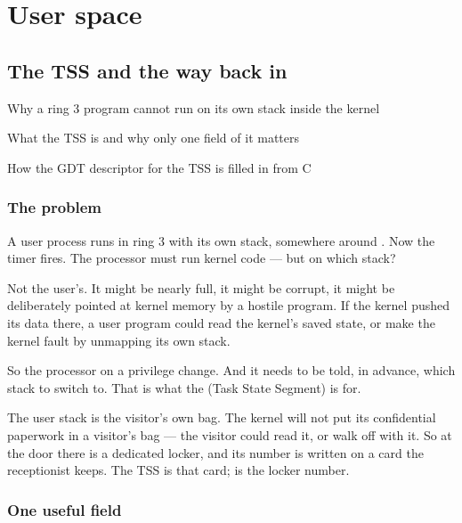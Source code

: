 \part{User space}

\chapter{The TSS and the way back in}

\begin{goals}
  \item Why a ring 3 program cannot run on its own stack inside the kernel
  \item What the TSS is and why only one field of it matters
  \item How the GDT descriptor for the TSS is filled in from C
\end{goals}

\section{The problem}

A user process runs in ring 3 with its own stack, somewhere around . Now the timer
fires. The processor must run kernel code --- but on which stack?

Not the user's. It might be nearly full, it might be corrupt, it might be deliberately pointed at
kernel memory by a hostile program. If the kernel pushed its data there, a user program could read
the kernel's saved state, or make the kernel fault by unmapping its own stack.

So the processor  on a privilege change. And it needs to be
told, in advance, which stack to switch to. That is what the  (Task State Segment) is for.

\begin{analogy}
The user stack is the visitor's own bag. The kernel will not put its confidential paperwork in a
visitor's bag --- the visitor could read it, or walk off with it. So at the door there is a
dedicated locker, and its number is written on a card the receptionist keeps. The TSS is that card;
 is the locker number.
\end{analogy}

\section{One useful field}

